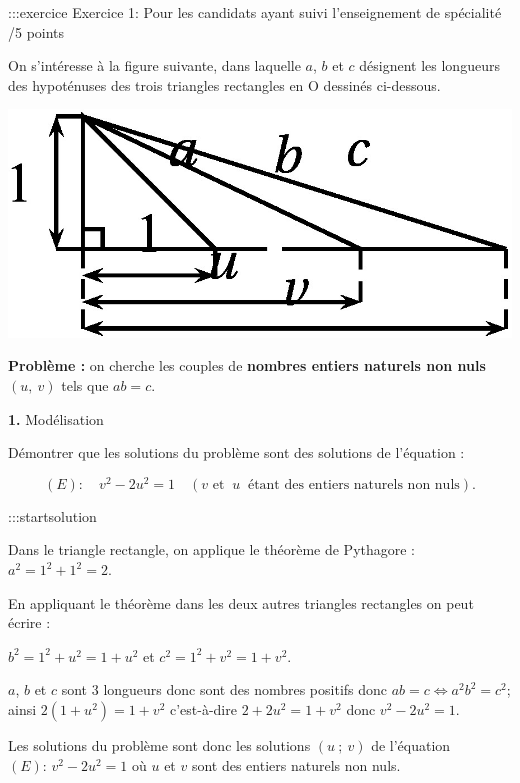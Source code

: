 \documentclass[12pt]{cornouaille}
\begin{document}
:::exercice Exercice 1: Pour les candidats ayant suivi l'enseignement de spécialité /5 points




On s'intéresse à la figure suivante, dans laquelle $a$, $b$ et $c$ désignent les longueurs des hypoténuses des trois triangles rectangles en O dessinés ci-dessous.




\includegraphics{./TS-BacBlanc-2020-Spe-0}




\textbf{Problème :} on cherche les couples de \textbf{nombres entiers naturels non nuls} $(u,~v)$ tels que $ab = c$.

\medskip





\textbf{1. } Modélisation

Démontrer que les solutions du problème sont des solutions de l'équation :


$$
(E) :\quad  v^2 - 2u^2 = 1\quad  (v \text{ et }\: u \: \text{ étant des entiers naturels non nuls}).
$$


:::startsolution

Dans le triangle rectangle, on applique le théorème de
Pythagore : $a^2=1^2+1^2=2$.

En appliquant le théorème dans les deux autres triangles rectangles on
peut écrire :

$b^2=1^2+u^2=1+u^2$ et $c^2=1^2+v^2=1+v^2$.

$a$, $b$ et $c$ sont 3 longueurs donc sont des nombres positifs donc
$ab=c \iff a^2b^2=c^2$; ainsi $2(1+u^2)=1+v^2$ c'est-à-dire
$2+2u^2=1+v^2$ donc $v^2-2u^2=1$.

Les solutions du problème sont donc les solutions $(u~;~v)$ de l'équation
$(E): \, v^2 - 2u^2=1$ où $u$ et $v $ sont des entiers naturels non nuls.
\end{document}
